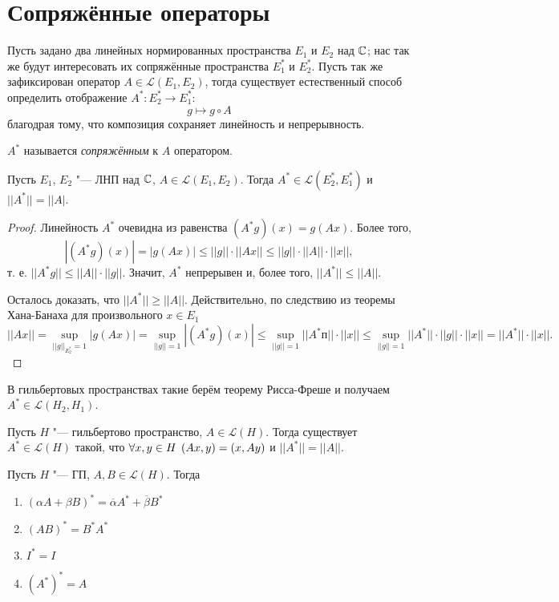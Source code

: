\documentclass[main]{subfiles}
\begin{document}
\section{Сопряжённые операторы} %

Пусть задано два линейных нормированных пространства
$E_1$ и $E_2$ над $\mathbb{C}$; нас так же будут
интересовать их сопряжённые пространства
$E_1^*$ и $E_2^*$.
Пусть так же зафиксирован оператор $A \in \mathcal{L}(E_1, E_2)$,
тогда существует естественный способ определить
отображение $A^* : E_2^* \to E_1^*$:
\[
  g \mapsto g \circ A
\]
благодрая тому, что композиция сохраняет линейность
и непрерывность.

\begin{definition}
  \( A^* \) называется \emph{сопряжённым} к \( A \) оператором.
\end{definition}

\begin{theorem}%
  Пусть $E_1$, $E_2$ "--- ЛНП над $\mathbb{C}$,
  $A \in \mathcal{L}(E_1, E_2)$.
  Тогда $A^* \in \mathcal{L}(E_2^*, E_1^*)$
  и $||A^*|| = ||A|$.
\end{theorem}
\begin{proof}
  Линейность $A^*$ очевидна из равенства
  $(A^* g)(x) = g(Ax)$. Более того,
  \[
    |(A^* g)(x)| = |g(Ax)| \le
    ||g|| \cdot ||Ax|| \le ||g|| \cdot ||A|| \cdot ||x||,
  \]
  т. е. $||A^* g|| \le ||A|| \cdot ||g||$.
  Значит, $A^*$ непрерывен и, более того,
  $||A^*|| \le ||A||$.

  Осталось доказать, что $||A^*|| \ge ||A||$.
  Действительно, по следствию из теоремы Хана-Банаха для произвольного $x \in E_1$
  \[
    ||A x|| = \sup_{||g||_{E_2^*} = 1} |g(Ax)| =
    \sup_{||g|| = 1} |(A^* g)(x)| \le
    \sup_{||g|| = 1} ||A^* п|| \cdot ||x|| \le
    \sup_{||g|| = 1} ||A^*|| \cdot ||g|| \cdot ||x|| =
    ||A^*|| \cdot ||x||.
  \]
\end{proof}

В гильбертовых пространствах такие берём теорему
Рисса-Фреше и получаем $A^* \in \mathcal{L}(H_2, H_1)$.

\begin{exercise}[без Т11.1]
  Пусть $H$ "--- гильбертово пространство,
  $A \in \mathcal{L}(H)$.
  Тогда существует $A^* \in \mathcal{L}(H)$
  такой, что
  \( \forall {x, y \in H} \; \, (Ax, y) = (x, Ay) \)
  и $||A^*|| = ||A||$.
\end{exercise}

\begin{exercise}
  Пусть $H$ "--- ГП, $A, B \in \mathcal{L}(H)$.
  Тогда
  \begin{enumerate}
    \item $(\alpha A + \beta B)^* = \overline{\alpha} A^* + \overline{\beta} B^*$
    \item $(AB)^* = B^* A^*$
    \item $I^* = I$
    \item $(A^*)^* = A$
  \end{enumerate}
\end{exercise}
\end{document}
